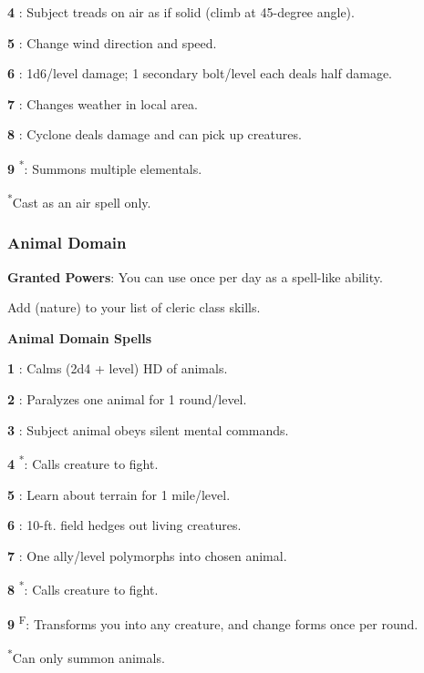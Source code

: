 \textbf{4} : Subject treads on air as if solid (climb at 45-degree angle).

\textbf{5} : Change wind direction and speed.

\textbf{6} : 1d6/level damage; 1 secondary bolt/level each deals half damage.

\textbf{7} : Changes weather in local area.

\textbf{8} : Cyclone deals damage and can pick up creatures.

\textbf{9} \textsuperscript{*}: Summons multiple elementals.

\textsuperscript{*}Cast as an air spell only.

\subsubsection{Animal Domain}

\textbf{Granted Powers}: You can use  once per day as a spell-like ability.

Add  (nature) to your list of cleric class skills.

\textbf{Animal Domain Spells}

\textbf{1} : Calms (2d4 + level) HD of animals.

\textbf{2} : Paralyzes one animal for 1 round/level.

\textbf{3} : Subject animal obeys silent mental commands.

\textbf{4} \textsuperscript{*}: Calls creature to fight.

\textbf{5} : Learn about terrain for 1 mile/level.

\textbf{6} : 10-ft. field hedges out living creatures.

\textbf{7} : One ally/level polymorphs into chosen animal.

\textbf{8} \textsuperscript{*}: Calls creature to fight.

\textbf{9} \textsuperscript{F}: Transforms you into any creature, and change forms once per round.

\textsuperscript{*}Can only summon animals.

